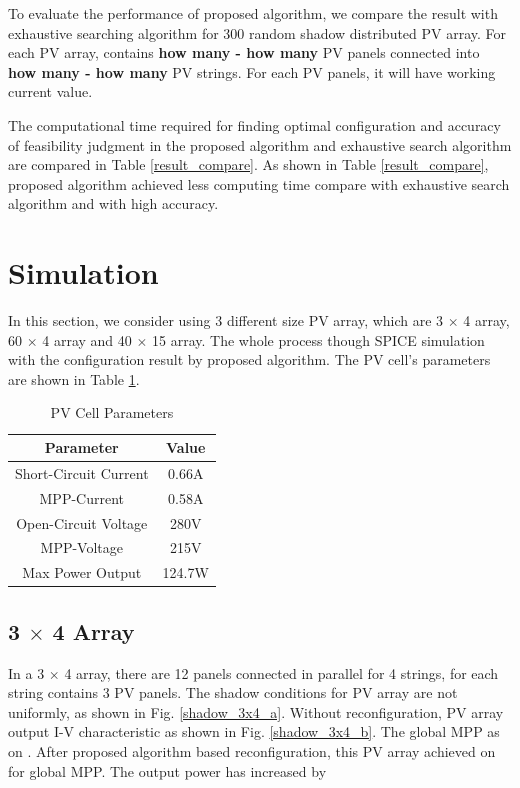 \documentclass[conference]{IEEEtran}
\begin{document}
To evaluate the performance of proposed algorithm, we compare the result with exhaustive searching algorithm for 300 random shadow distributed PV array. For each PV array, contains {\color{red} \textbf{how many - how many}} PV panels connected into {\color{red} \textbf{how many - how many}} PV strings. For each PV panels, it will have {\color{red}{how many - how many}} working current value.

The computational time required for finding optimal configuration and accuracy of feasibility judgment in the proposed algorithm and exhaustive search algorithm are compared in Table \ref{result_compare}. As shown in Table \ref{result_compare}, proposed algorithm achieved less computing time compare with exhaustive search algorithm and with high accuracy.  
\section{Simulation}\label{Sec6}
In this section, we consider using 3 different size PV array, which are 3 $\times$ 4 array, 60 $\times$ 4 array and 40 $\times$ 15 array. The whole process though SPICE simulation with the configuration result by proposed algorithm. The PV cell's parameters are shown in Table \ref{PV_cell_par}.

\begin{table}[]
\caption{PV Cell Parameters}
\begin{center}
\begin{tabular}{c|c}
\hline \hline
Parameter             & Value  \\ \hline
Short-Circuit Current & 0.66A  \\
MPP-Current           & 0.58A  \\
Open-Circuit Voltage  & 280V   \\
MPP-Voltage           & 215V  \\
Max Power Output      & 124.7W 
\end{tabular}
\end{center}
\label{PV_cell_par}
\end{table}
\subsection{3 $\times$ 4 Array}
In a 3 $\times$ 4 array, there are 12 panels connected in parallel for 4 strings, for each string contains 3 PV panels. The shadow conditions for PV array are not uniformly, as shown in Fig. \ref{shadow_3x4_a}. Without reconfiguration, PV array output I-V characteristic as shown in Fig. \ref{shadow_3x4_b}. The global MPP as {\color{red}{how many Watt}} on {\color{red}{how many voltage}}. After proposed algorithm based reconfiguration, this PV array achieved {\color{red}{how many Watt}} on {\color{red}{how many voltage}} for global MPP. The output power has increased by {\color{red}{how many \%}}
\end{document}
